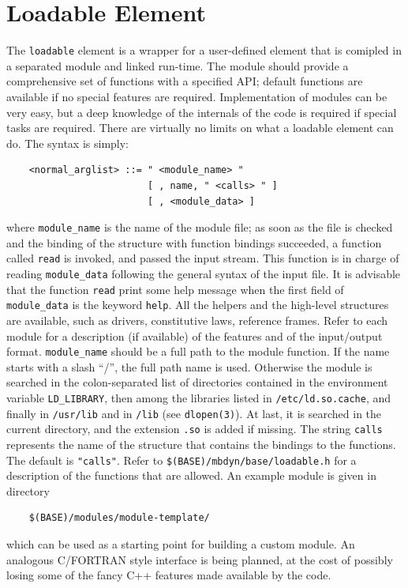 \section{Loadable Element}
The \texttt{loadable} element is a wrapper for a user-defined element that is
comipled in a separated module and linked run-time.
The module should provide a comprehensive set of functions with a specified
API; default functions are available if no special features are required.
Implementation of modules can be very easy, but a deep knowledge of the
internals of the code is required if special tasks are required. 
There are virtually no limits on what a loadable element can do.
The syntax is simply:
\begin{verbatim}
    <normal_arglist> ::= " <module_name> "
                         [ , name, " <calls> " ] 
                         [ , <module_data> ]
\end{verbatim}
where \texttt{module\_name} is the name of the module file; as soon as the file
is checked and the binding of the structure with function bindings 
succeeded, a function called \texttt{read} is invoked, and passed the input
stream.
This function is in charge of reading \texttt{module\_data} following the
general syntax of the input file.
It is advisable that the function \texttt{read} print some help message
when the first field of \texttt{module\_data} is the keyword \texttt{help}.
All the helpers and the high-level structures are available, such as
drivers, constitutive laws, reference frames.
Refer to each module for a description (if available) of the features and of
the input/output format.
\texttt{module\_name} should be a full path to the module function.
If the name starts with a slash ``/'', the full path name is used.
Otherwise the module is searched in the colon-separated list of directories 
contained in the environment variable \texttt{LD\_LIBRARY}, then among the
libraries listed in \texttt{/etc/ld.so.cache}, and finally in
\texttt{/usr/lib} and in \texttt{/lib} (see \texttt{dlopen(3)}).
At last, it is searched in the current directory, and the extension
\texttt{.so} is added if missing.
The string \texttt{calls} represents the name of the structure that contains
the bindings to the functions.
The default is \texttt{"calls"}.
Refer to \texttt{\$(BASE)/mbdyn/base/loadable.h} for a description of the
functions that are allowed.
An example module is given in directory
\begin{verbatim}
    $(BASE)/modules/module-template/
\end{verbatim}
which can be used as a starting point for building a custom module.
An analogous C/FORTRAN style interface is being planned, at the cost of
possibly losing some of the fancy C++ features made available by the code.





